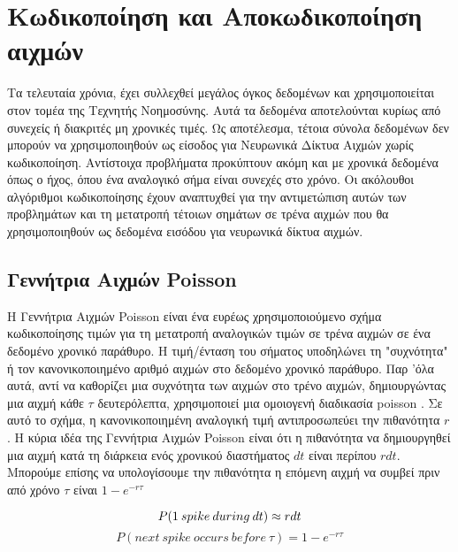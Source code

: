 \documentclass[12pt]{report}
\begin{document}
\section{Κωδικοποίηση και Αποκωδικοποίηση αιχμών}

Τα τελευταία χρόνια, έχει συλλεχθεί μεγάλος όγκος δεδομένων και χρησιμοποιείται στον τομέα της Τεχνητής Νοημοσύνης. Αυτά τα δεδομένα αποτελούνται κυρίως από συνεχείς ή διακριτές μη χρονικές τιμές. Ως αποτέλεσμα, τέτοια σύνολα δεδομένων δεν μπορούν να χρησιμοποιηθούν ως είσοδος για Νευρωνικά Δίκτυα Αιχμών χωρίς κωδικοποίηση. Αντίστοιχα προβλήματα προκύπτουν ακόμη και με χρονικά δεδομένα όπως ο ήχος, όπου ένα αναλογικό σήμα είναι συνεχές στο χρόνο. Οι ακόλουθοι αλγόριθμοι κωδικοποίησης έχουν αναπτυχθεί για την αντιμετώπιση αυτών των προβλημάτων και τη μετατροπή τέτοιων σημάτων σε τρένα αιχμών που θα χρησιμοποιηθούν ως δεδομένα εισόδου για νευρωνικά δίκτυα αιχμών.

\subsection{Γεννήτρια Αιχμών \textlatin{Poisson}}

Η Γεννήτρια Αιχμών \textlatin{Poisson} είναι ένα ευρέως χρησιμοποιούμενο σχήμα κωδικοποίησης τιμών για τη μετατροπή αναλογικών τιμών σε τρένα αιχμών σε ένα δεδομένο χρονικό παράθυρο. Η τιμή/ένταση του σήματος υποδηλώνει τη "συχνότητα" ή τον κανονικοποιημένο αριθμό αιχμών στο δεδομένο χρονικό παράθυρο. Παρ 'όλα αυτά, αντί να καθορίζει μια συχνότητα των αιχμών στο τρένο αιχμών, δημιουργώντας μια αιχμή κάθε \(\tau\) δευτερόλεπτα, χρησιμοποιεί μια ομοιογενή διαδικασία \textlatin{poisson} \cite{Heeger2000}. Σε αυτό το σχήμα, η κανονικοποιημένη αναλογική τιμή αντιπροσωπεύει την πιθανότητα \(r\). Η κύρια ιδέα της Γεννήτρια Αιχμών \textlatin{Poisson} είναι ότι η πιθανότητα να δημιουργηθεί μια αιχμή κατά τη διάρκεια ενός χρονικού διαστήματος \(dt\) είναι περίπου \(rdt\). Μπορούμε επίσης να υπολογίσουμε την πιθανότητα η επόμενη αιχμή να συμβεί πριν από χρόνο \(\tau\) είναι \(1-e^{-r\tau}\)

\begin{equation}
    P(1\:spike\:during\:dt) \approx rdt \\
\end{equation}
\begin{equation}
    P(next\:spike\:occurs\:before\:\tau) = 1-e^{-r\tau}
\end{equation}

\medskip
\end{document}

